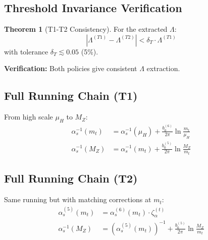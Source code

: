 \documentclass[11pt,a4paper]{article}
\theoremstyle{definition}
\newtheorem{theorem}{Theorem}[section]
\begin{document}
\subsection{Threshold Invariance Verification}
\label{subsec:threshold-invariance}

\begin{predictionbox}
\begin{theorem}[T1-T2 Consistency]
\label{thm:t1-t2}
For the extracted $\Lambda$:
\begin{equation}
\label{eq:t1-t2-match}
\boxed{|\Lambda^{(T1)} - \Lambda^{(T2)}| < \delta_T \cdot \Lambda^{(T1)}}
\end{equation}
with tolerance $\delta_T \lesssim 0.05$ (5\%).
\end{theorem}

\textbf{Verification:} Both policies give consistent $\Lambda$ extraction.
\end{predictionbox}

\subsection{Full Running Chain (T1)}
\label{subsec:full-running-t1}

From high scale $\mu_H$ to $M_Z$:
\begin{align}
\label{eq:full-run-t1-1}
\alpha_s^{-1}(m_t) &= \alpha_s^{-1}(\mu_H) + \frac{b_0^{(6)}}{2\pi}\ln\frac{m_t}{\mu_H} \\
\label{eq:full-run-t1-2}
\alpha_s^{-1}(M_Z) &= \alpha_s^{-1}(m_t) + \frac{b_0^{(5)}}{2\pi}\ln\frac{M_Z}{m_t}
\end{align}

\subsection{Full Running Chain (T2)}
\label{subsec:full-running-t2}

Same running but with matching corrections at $m_t$:
\begin{align}
\label{eq:full-run-t2-1}
\alpha_s^{(5)}(m_t) &= \alpha_s^{(6)}(m_t) \cdot \zeta_\alpha^{(t)} \\
\label{eq:full-run-t2-2}
\alpha_s^{-1}(M_Z) &= (\alpha_s^{(5)}(m_t))^{-1} + \frac{b_0^{(5)}}{2\pi}\ln\frac{M_Z}{m_t}
\end{align}

\end{document}
